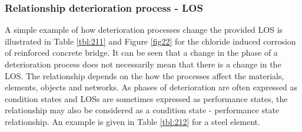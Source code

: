 \subsubsection{Relationship deterioration process - LOS}

A simple example of how deterioration processes change the provided LOS is illustrated in Table \ref{tbl:211} and Figure \ref{fig22} for the chloride induced corrosion of reinforced concrete bridge. It can be seen that a change in the phase of a deterioration process does not necessarily mean that there is a change in the LOS. The relationship depends on the how the processes affect the materials, elements, objects and networks. As phases of deterioration are often expressed as condition states and LOSs are sometimes expressed as performance states, the relationship may also be considered as a condition state - performance state relationship. An example is given in Table \ref{tbl:212} for a steel element. 

